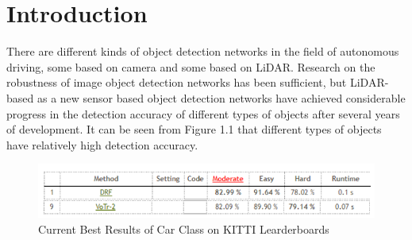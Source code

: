 
\chapter{Introduction}
\label{sec:introduction}


There are different kinds of object detection networks in the field of autonomous driving, some based on camera and some based on LiDAR. Research on the robustness of image object detection networks has been sufficient, but LiDAR-based as a new sensor based object detection networks have achieved considerable progress in the detection accuracy of different types of objects after several years of development. It can be seen from Figure 1.1 that different types of objects have relatively high detection accuracy. 
\begin{figure}[!htbp]
\centering
\includegraphics[scale=0.5]{Graphics/KITTI Leaderboards.png}
\caption{Current Best Results of Car Class on KITTI\cite{geiger_vision_2013} Learderboards}
\label{fig:KITTI Learderboards}
\end{figure}


